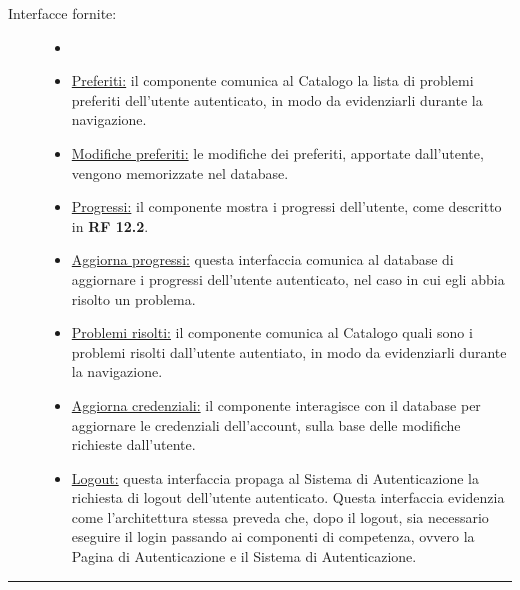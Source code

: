 \documentclass[11pt, a4paper]{article}
\theoremstyle{definition} %
\begin{document}
\begin{description}
    \item[Interfacce fornite:]
    \begin{itemize}
        \item[]

        \item \underline{Preferiti:} il componente comunica al Catalogo la
        lista di problemi preferiti dell'utente autenticato, in modo da
        evidenziarli durante la navigazione.

        \item \underline{Modifiche preferiti:} le modifiche dei preferiti,
        apportate dall'utente, vengono memorizzate nel database.

        \item \underline{Progressi:} il componente mostra i progressi dell'utente,
        come descritto in \textbf{RF 12.2}.

        \item \underline{Aggiorna progressi:} questa interfaccia comunica al
        database di aggiornare i progressi dell'utente autenticato, nel caso
        in cui egli abbia risolto un problema.

        \item \underline{Problemi risolti:} il componente comunica al Catalogo
        quali sono i problemi risolti dall'utente autentiato, in modo da
        evidenziarli durante la navigazione.

        \item \underline{Aggiorna credenziali:} il componente interagisce con
        il database per aggiornare le credenziali dell'account, sulla base delle
        modifiche richieste dall'utente.
        
        \item \underline{Logout:} questa interfaccia propaga al
        Sistema di Autenticazione la richiesta di logout dell'utente autenticato.
        Questa interfaccia evidenzia come l'architettura stessa preveda che,
        dopo il logout, sia necessario eseguire il login passando ai componenti
        di competenza, ovvero la Pagina di Autenticazione e il Sistema di Autenticazione.
    \end{itemize}
\end{description}

\begin{center}
    \rule{5cm}{1pt}
\end{center}
\end{document}
